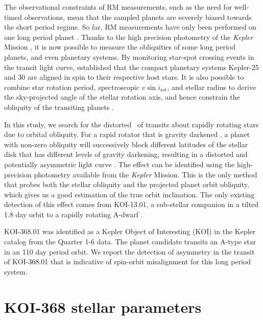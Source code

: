 \documentclass[iop]{emulateapj}
\begin{document}
The observational constraints of RM measurements, such as the 
need for well-timed observations, mean that the sampled planets are severely biased towards the 
short period regime. So far, RM measurements have only been performed on one long period planet 
\citep[HD 80606b, period 111.8 days,][]{Moutou:2009,Winn:2009}. Thanks to the high precision 
photometry of the \emph{Kepler} Mission \citep{Borucki:2010}, it is now possible to measure the 
obliquities of some long period planets, and even planetary systems. By monitoring star-spot 
crossing events in the transit light curve, \citet{Sanchis-Ojeda:2012,Albrecht:2013} 
established that the compact planetary systems Kepler-25 and 30 are aligned in spin to their 
respective host stars. It is also possible to combine star rotation period, spectroscopic 
$v\sin i_\text{rot}$, and stellar radius to derive the sky-projected angle of the stellar 
rotation axis, and hence constrain the obliquity of the transiting planets \citep[e.g.][]{Hirano:2012,Chaplin:2013}.

In this study, we search for the distorted \lc\ of transits about rapidly rotating stars due to orbital obliquity. For a rapid 
rotator that is gravity darkened \citep{Zeipel:1924}, a planet with non-zero obliquity will successively 
block different latitudes of the stellar disk that has different levels of gravity darkening, resulting in a distorted 
and potentially asymmetric light curve \citep{Barnes:2009}. The effect can be identified using the high-precision 
photometry available from the \emph{Kepler} Mission. This is the only method
that probes both the stellar obliquity and the projected planet orbit 
obliquity, which gives us a good estimation of the true orbit inclination. The only 
existing detection of this effect comes from KOI-13.01, a sub-stellar companion 
in a tilted 1.8 day orbit to a rapidly rotating A-dwarf \citep{Szabo:2011,Barnes:2011}.


KOI-368.01 was identified as a Kepler Object of Interesting (KOI) in the \citet{Batalha:2013} Kepler catalog 
from the Quarter 1-6 data. The planet candidate transits an A-type star in an 110 day period orbit. We report the 
detection of asymmetry in the transit of KOI-368.01 that is indicative of spin-orbit misalignment for this long 
period system.

\section{KOI-368 stellar parameters}
\label{sec:host-star-parameters}
\end{document}
